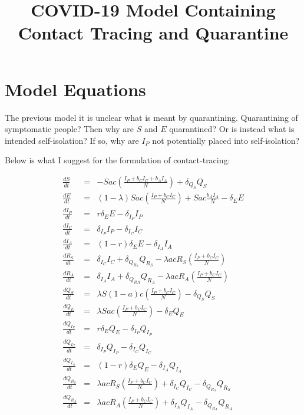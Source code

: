 \documentclass[12pt]{article}
\title{COVID-19 Model Containing Contact Tracing and Quarantine}
\date{}
\begin{document}
 

\maketitle

\section{Model Equations} \label{equations}

The previous model it is unclear what is meant by quarantining. Quarantining of symptomatic people? Then why are $S$ and $E$ quarantined? Or is instead what is intended self-isolation? If so, why are $I_P$ not potentially placed into self-isolation?

Below is what I suggest for the formulation of contact-tracing:

\begin{eqnarray}
\frac{dS}{dt} &=&  - S a c \left( \frac{I_P + b_CI_C + b_AI_A}{N}\right)  + \delta_{Q_S}  Q_S \\
\frac{dE}{dt} &=& (1-\lambda)S a c \left( \frac{I_P + b_CI_C}{N}\right) + S ac \frac{b_A I_A}{N}  - \delta_E E \\
\frac{dI_P}{dt} &=& r\delta_E E - \delta_{I_P} I_P\\
\frac{dI_C}{dt} &=& \delta_{I_P} I_P - \delta_{I_C} I_C\\
\frac{dI_A}{dt} &=& (1-r) \delta_E E - \delta_{I_A} I_A\\
\frac{dR_S}{dt} &=& \delta_{I_C} I_C +  \delta_{Q_{R_S}} Q_{R_S} - \lambda a c R_S \left( \frac{I_P + b_CI_C}{N}\right)\\
\frac{dR_A}{dt} &=& \delta_{I_A} I_A + \delta_{Q_{RA}} Q_{R_A} - \lambda a c R_A \left( \frac{I_P + b_CI_C}{N}\right)  \\
\frac{dQ_S}{dt} &=& \lambda S (1-a) c \left( \frac{I_P + b_CI_C}{N}\right) - \delta_{Q_S}  Q_S \\
\frac{dQ_E}{dt} &=&\lambda S a c \left( \frac{I_P + b_CI_C}{N}\right)  - \delta_E Q_E\\
\frac{dQ_{I_P}}{dt} &=& r \delta_E Q_E -\delta_{I_P} Q_{I_P}\\
\frac{dQ_{I_C}}{dt} &=& \delta_{I_P} Q_{I_P} - \delta_{I_C} Q_{I_C}\\
\frac{dQ_{I_A}}{dt} &=&  (1-r)\delta_E Q_E -\delta_{I_A} Q_{I_A}\\
\frac{dQ_{R_S}}{dt} &=& \lambda a c R_S \left( \frac{I_P + b_CI_C}{N}\right)+\delta_{I_C} Q_{I_C} - \delta_{Q_{R_S}} Q_{R_S}\\
\frac{dQ_{R_A}}{ dt} &=& \lambda a c R_A \left( \frac{I_P + b_CI_C}{N}\right) +\delta_{I_A} Q_{I_A} - \delta_{Q_{R_A}}Q_{R_A}
\end{eqnarray}
\end{document}

